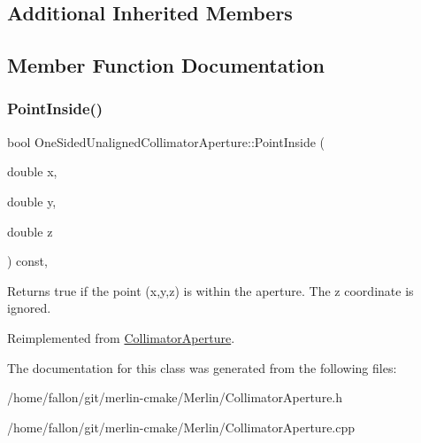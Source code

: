 \subsection*{Additional Inherited Members}


\subsection{Member Function Documentation}
\mbox{\label{classOneSidedUnalignedCollimatorAperture_afad818345b971dffa9ca6fa36a166e35}} 
\subsubsection{\texorpdfstring{Point\+Inside()}{PointInside()}}
{\footnotesize\ttfamily bool One\+Sided\+Unaligned\+Collimator\+Aperture\+::\+Point\+Inside (\begin{DoxyParamCaption}\item[{double}]{x,  }\item[{double}]{y,  }\item[{double}]{z }\end{DoxyParamCaption}) const\hspace{0.3cm}{\ttfamily [inline]}, {\ttfamily [virtual]}}

Returns true if the point (x,y,z) is within the aperture. The z coordinate is ignored. 

Reimplemented from \hyperlink{classCollimatorAperture_a964f63287a0ab48900859d75dfa644dc}{Collimator\+Aperture}.



The documentation for this class was generated from the following files\+:\begin{DoxyCompactItemize}
\item 
/home/fallon/git/merlin-\/cmake/\+Merlin/Collimator\+Aperture.\+h\item 
/home/fallon/git/merlin-\/cmake/\+Merlin/Collimator\+Aperture.\+cpp\end{DoxyCompactItemize}
